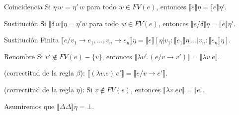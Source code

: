    \begin{theorem}{Coincidencia} Si $\eta\, w$ = $\eta'\, w$ para todo $w \in FV(e)$,
      entonces $\llbracket e\rrbracket \eta = \llbracket e\rrbracket \eta'$.
    \end{theorem}
        
    \begin{theorem}{Sustitución} Si $\llbracket \delta\, w\rrbracket\eta = \eta' w$ para todo
      $w \in FV(e)$, entonces $\llbracket e/\delta\rrbracket \eta =\llbracket e\rrbracket\eta'$.
    \end{theorem}
    
    \begin{theorem}{Sustitución Finita} $\llbracket e/v_1\to e_1, \ldots,
      v_n\to e_n\rrbracket\eta = \llbracket e\rrbracket[\eta|v_1:
      \llbracket e_1\rrbracket\eta|\ldots|v_n:\llbracket e_n\rrbracket\eta]$.
    \end{theorem}
    
    \begin{theorem}{Renombre} Si $v' \not\in FV(e)-\{v\}$, entonces
      $\llbracket\lambda v'.(e/v\to v')\rrbracket = \llbracket\lambda
      v.e\rrbracket$.
    \end{theorem}
        
    \begin{property}(correctitud de la regla $\beta$): $\llbracket(\lambda v.e)\, e'\rrbracket = \llbracket e/v\to e'\rrbracket$.
    \end{property}
        
    \begin{property}
      (correctitud de la regla $\eta$): Si $v \not\in FV(e)$, entonces
      $\llbracket\lambda v.e v\rrbracket = \llbracket e\rrbracket$.
    \end{property}
        
    \PN Asumiremos que $\llbracket\Delta \Delta\rrbracket\eta = \bot$.

